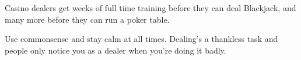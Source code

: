 Casino dealers get weeks of full time training before they can deal
Blackjack, and many more before they can run a poker table.

Use commonsense and stay calm at all times. Dealing's a
thankless task and people only notice you as a dealer when you're
doing it badly.



